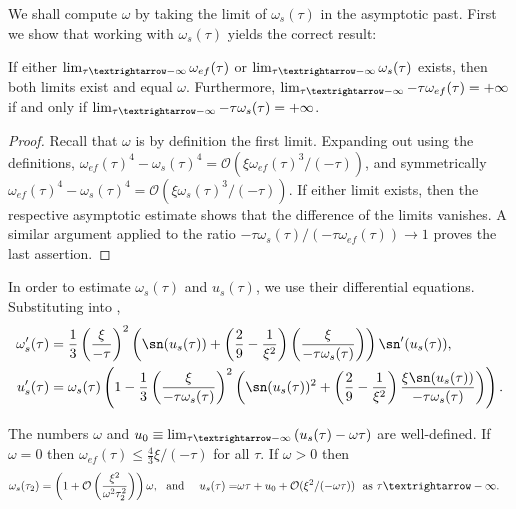 We shall compute $\omega$ by taking the limit of $\omega_{s}(\tau)$ in the asymptotic past. First we show that working with $\omega_{s}(\tau)$ yields the correct result:
\begin{lem}
\label{lem:omega-ef-equivalent-to-omega-s}If either $\lim_{\tau\textrightarrow-\infty}\omega_{ef}(\tau)$ or $\lim_{\tau\textrightarrow-\infty}\omega_{s}(\tau)$ exists, then both limits exist and equal $\omega$. Furthermore, $\lim_{\tau\textrightarrow-\infty}-\tau\omega_{ef}(\tau)=+\infty$ if and only if $\lim_{\tau\textrightarrow-\infty}-\tau\omega_{s}(\tau)=+\infty$. 
\end{lem}

\begin{proof}
Recall that $\omega$ is by definition the first limit. Expanding out using the definitions, $\omega_{ef}(\tau)^{4}-\omega_{s}(\tau)^{4}=\mathcal{O}(\xi\omega_{ef}(\tau)^{3}/(-\tau))$, and symmetrically $\omega_{ef}(\tau)^{4}-\omega_{s}(\tau)^{4}=\mathcal{O}(\xi\omega_{s}(\tau)^{3}/(-\tau))$. If either limit exists, then the respective asymptotic estimate shows that the difference of the limits vanishes. A similar argument applied to the ratio $-\tau\omega_{s}(\tau)/(-\tau\omega_{ef}(\tau))\to1$ proves the last assertion. 
\end{proof}
In order to estimate $\omega_{s}(\tau)$ and $u_{s}(\tau)$, we use their differential equations. Substituting  into , 
\begin{align}
\omega_{s}'(\tau) & =\frac{1}{3}\left(\frac{\xi}{-\tau}\right)^{2}\left(\sn(u_{s}(\tau))+\left(\frac{2}{9}-\frac{1}{\xi^{2}}\right)\left(\frac{\xi}{-\tau\omega_{s}(\tau)}\right)\right)\sn'(u_{s}(\tau)),\label{eq:omega-eom}\\
u_{s}'(\tau) & =\omega_{s}(\tau)\left(1-\frac{1}{3}\left(\frac{\xi}{-\tau\omega_{s}(\tau)}\right)^{2}\left(\sn(u_{s}(\tau))^{2}+\left(\frac{2}{9}-\frac{1}{\xi^{2}}\right)\frac{\xi\sn(u_{s}(\tau))}{-\tau\omega_{s}(\tau)}\right)\right).\label{eq:u-eom}
\end{align}

\begin{thm}
\label{thm:omega-s}The numbers $\omega$ and $u_{0}\equiv\lim_{\tau\textrightarrow-\infty}\left(u_{s}(\tau)-\omega\tau\right)$ are well-defined. If $\omega=0$ then $\omega_{ef}(\tau)\leq\tfrac{4}{3}\xi/(-\tau)$ for all $\tau$. If $\omega>0$ then 
\begin{align*}
\omega_{s}(\tau_{2}) & =\left(1+\mathcal{O}\left(\frac{\xi^{2}}{\omega^{2}\tau_{2}^{2}}\right)\right)\omega,\ \textrm{ and } & u_{s}(\tau)= & \omega\tau+u_{0}+\mathcal{O}(\xi^{2}/(-\omega\tau))\ \textrm{ as }\tau\textrightarrow-\infty.
\end{align*}
\end{thm}

